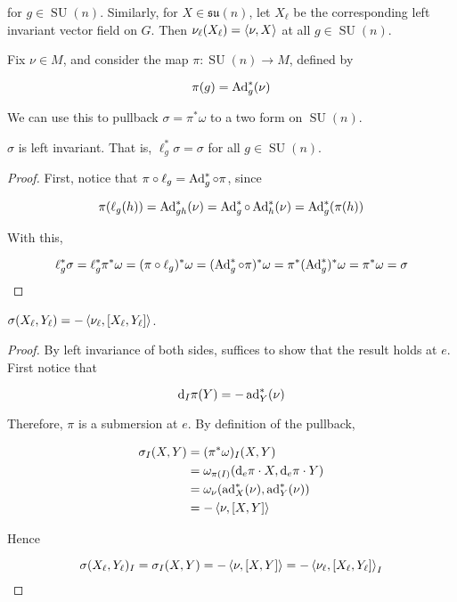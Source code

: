 \documentclass{article}
\DeclareMathOperator{\SU}{SU}
\newcommand{\su}{\mathfrak{su}}
\begin{document}
for \(g \in \SU(n)\). Similarly, for \(X \in \su(n)\), let \(X_\ell\) be the corresponding left invariant vector field on \(G\). Then \(\nu_\ell(X_\ell) = \left\langle \nu, X \right\rangle\) at all \(g \in \SU(n)\).

Fix \(\nu \in  M\), and consider the map \(\pi : \SU(n) \to  M\), defined by

\[\pi(g) = \operatorname{Ad}_g^*(\nu)\]

We can use this to pullback \(\sigma = \pi^*\omega\) to a two form on \(\SU(n)\).

\begin{lemma}
    \(\sigma\) is left invariant. That is, \(\ell_g^*\sigma = \sigma\) for all \(g \in \SU(n)\).
    \label{lem:left-inv}
\end{lemma}

\begin{proof}
    First, notice that \(\pi \circ \ell_g = \operatorname{Ad}_g^* \circ \pi\), since

    \[\pi(\ell_g(h)) = \operatorname{Ad}_{gh}^*(\nu) = \operatorname{Ad}_g^*\circ \operatorname{Ad}_h^*(\nu) = \operatorname{Ad}_g^*(\pi(h))\]

    With this,

    \[\ell_g^*\sigma = \ell_g^*\pi^*\omega = (\pi\circ\ell_g)^*\omega = (\operatorname{Ad}_g^* \circ \pi)^*\omega = \pi^*(\operatorname{Ad}_g^*)^*\omega = \pi^*\omega = \sigma\]
\end{proof}

\begin{lemma}
    \(\sigma(X_\ell, Y_\ell) = -\left\langle \nu_\ell, [X_\ell, Y_\ell] \right\rangle\).
\end{lemma}

\begin{proof}
    By left invariance of both sides, suffices to show that the result holds at \(e\). First notice that

    \[\dd_I\pi(Y) = -\operatorname{ad}_Y^*(\nu)\]

    Therefore, \(\pi\) is a submersion at \(e\). By definition of the pullback,

    \begin{align*}
        \sigma_I(X, Y) &= (\pi^*\omega)_I(X, Y)\\ 
        &= \omega_{\pi(I)}(\dd_e\pi \cdot X, \dd_e\pi\cdot Y) \\
        &= \omega_\nu(\operatorname{ad}_X^*(\nu), \operatorname{ad}_Y^*(\nu)) \\
        &= -\left\langle \nu, [X, Y] \right\rangle
    \end{align*}

    Hence

    \[\sigma(X_\ell, Y_\ell)_I = \sigma_I(X, Y) = -\left\langle \nu, [X, Y] \right\rangle = -\left\langle \nu_\ell, [X_\ell, Y_\ell] \right\rangle_I\]
\end{proof}
\end{document}
